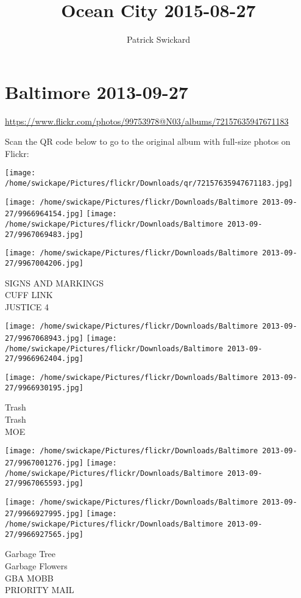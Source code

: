 \documentclass[10pt,letterpaper]{article}
\title{Ocean City 2015-08-27}
\author{Patrick Swickard}
\date{}
\begin{document}
\section*{Baltimore 2013-09-27}

\url{https://www.flickr.com/photos/99753978@N03/albums/72157635947671183}

Scan the QR code below to go to the original album with full-size photos on Flickr:

\texttt{[image: /home/swickape/Pictures/flickr/Downloads/qr/72157635947671183.jpg]}
\pagebreak

\texttt{[image: /home/swickape/Pictures/flickr/Downloads/Baltimore 2013-09-27/9966964154.jpg]}
\texttt{[image: /home/swickape/Pictures/flickr/Downloads/Baltimore 2013-09-27/9967069483.jpg]}

\vspace{0.25in}
\texttt{[image: /home/swickape/Pictures/flickr/Downloads/Baltimore 2013-09-27/9967004206.jpg]}

SIGNS AND MARKINGS\\
CUFF LINK\\
JUSTICE 4
\pagebreak

\texttt{[image: /home/swickape/Pictures/flickr/Downloads/Baltimore 2013-09-27/9967068943.jpg]}
\texttt{[image: /home/swickape/Pictures/flickr/Downloads/Baltimore 2013-09-27/9966962404.jpg]}

\vspace{0.25in}
\texttt{[image: /home/swickape/Pictures/flickr/Downloads/Baltimore 2013-09-27/9966930195.jpg]}

Trash\\
Trash\\
MOE
\pagebreak

\texttt{[image: /home/swickape/Pictures/flickr/Downloads/Baltimore 2013-09-27/9967001276.jpg]}
\texttt{[image: /home/swickape/Pictures/flickr/Downloads/Baltimore 2013-09-27/9967065593.jpg]}

\texttt{[image: /home/swickape/Pictures/flickr/Downloads/Baltimore 2013-09-27/9966927995.jpg]}
\texttt{[image: /home/swickape/Pictures/flickr/Downloads/Baltimore 2013-09-27/9966927565.jpg]}

Garbage Tree\\
Garbage Flowers\\
GBA MOBB\\
PRIORITY MAIL
\pagebreak
\end{document}
